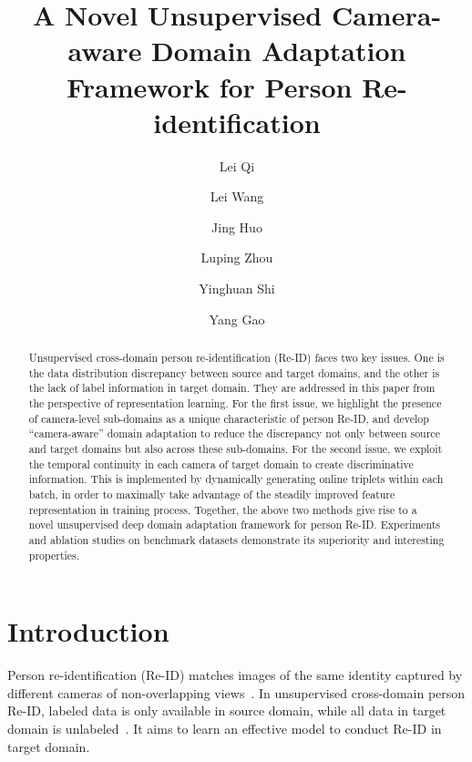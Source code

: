 \documentclass[10pt,twocolumn,letterpaper]{article}
\begin{document}
 
\title{A Novel Unsupervised Camera-aware Domain Adaptation Framework for Person Re-identification}
 
\author[1]{Lei Qi}
\author[2]{Lei Wang}
\author[1]{Jing Huo}
\author[3]{Luping Zhou}
\author[1]{Yinghuan Shi}
\author[1\thanks{Corresponding authors: Yang Gao; Lei Wang. The work of J. Huo was supported by NSFC (61806092) and Jiangsu Natural Science Foundation (BK20180326). The work of Y. Shi was supported by the Fundamental Research Funds for the Central Universities (020214380056), NSFC (61673203), CCF-Tencent Open Research Fund (RAGR20180114). The work of Y. Gao was supported by NSFC (61432008).}]{Yang Gao}
 
 
 
\maketitle


 
\begin{abstract}
Unsupervised cross-domain person re-identification (Re-ID) faces two key issues. One is the data distribution discrepancy between source and target domains, and the other is the lack of label information in target domain. They are addressed in this paper from the perspective of representation learning. 
For the first issue, we highlight the presence of camera-level sub-domains as a unique characteristic of person Re-ID, and develop ``camera-aware'' domain adaptation to reduce the discrepancy not only between source and target domains but also across these sub-domains.
For the second issue, we exploit the temporal continuity in each camera of target domain to create discriminative information. This is implemented by dynamically generating online triplets within each batch, in order to maximally take advantage of the steadily improved feature representation in training process. Together, the above two methods give rise to a novel unsupervised deep domain adaptation framework for person Re-ID. Experiments and ablation studies on benchmark datasets demonstrate its superiority and interesting properties.
\end{abstract}
 
\vspace{-15pt}
\section{Introduction}
Person re-identification (Re-ID) matches images of the same identity captured by different cameras of non-overlapping views~\cite{DBLP:journals/tmm/ChenLLCH11}. In unsupervised cross-domain person Re-ID, labeled data is only available in source domain, while all data in target domain is unlabeled~\cite{qi2018unsupervised}. 
It aims to learn an effective model to conduct Re-ID in target domain.
\end{document}
